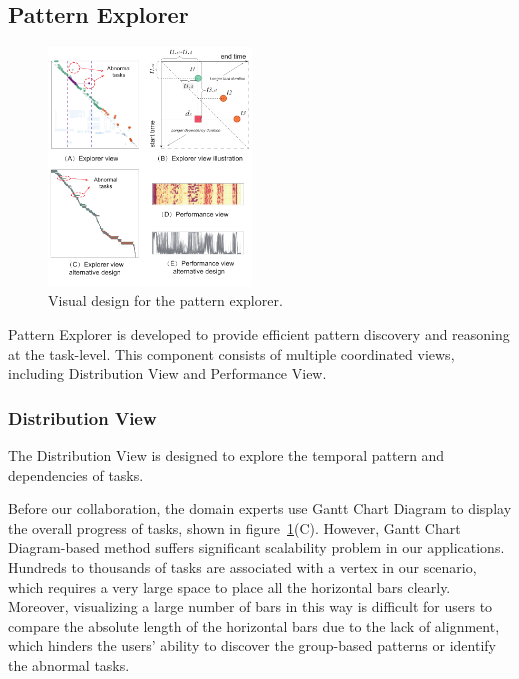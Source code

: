 \subsection{Pattern Explorer}


\begin{figure}[t]
	\centering
	\includegraphics[width=0.48\textwidth]{figures/visualization/patternexplorer.pdf}
	\vspace{-3mm}
	\caption{Visual design for the pattern explorer.}
	\label{fig:explorer}
	\vspace{-3mm}
\end{figure}


Pattern Explorer is developed to provide efficient pattern discovery and reasoning at the task-level. This component consists of multiple coordinated views, including Distribution View and Performance View.
\subsubsection{Distribution View}
The Distribution View is designed to explore the temporal pattern and dependencies of tasks.

Before our collaboration, the domain experts use Gantt Chart Diagram to display the overall progress of tasks, shown in figure~\ref{fig:explorer}(C). 
However, Gantt Chart Diagram-based method suffers significant scalability problem in our applications. Hundreds to thousands of tasks are associated with a vertex in our scenario, which requires a very large space to place all the horizontal bars clearly. 
Moreover, visualizing a large number of bars in this way is difficult for users to compare the absolute length of the horizontal bars due to the lack of alignment, which hinders the users' ability to discover the group-based patterns or identify the abnormal tasks.

